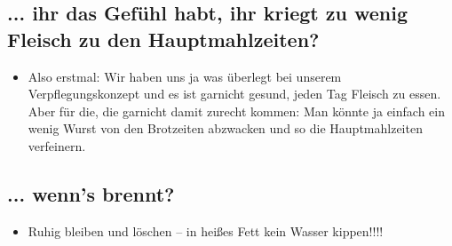 \subsection*{... ihr das Gefühl habt, ihr kriegt zu wenig Fleisch zu den Hauptmahlzeiten?} %
\label{sub:_ihr_das_gefuhl_habt_ihr_kriegt_zu_wenig_fleisch_zu_den_hauptmahlzeiten}
\begin{itemize}
    \item Also erstmal: Wir haben uns ja was überlegt bei unserem Verpflegungskonzept und es ist garnicht gesund, jeden Tag Fleisch zu essen. Aber für die, die garnicht damit zurecht kommen: Man könnte ja einfach ein wenig Wurst von den Brotzeiten abzwacken und so die Hauptmahlzeiten verfeinern.
\end{itemize}

\subsection*{... wenn's brennt?} %
\label{sub:_wenn_s_brennt}
\begin{itemize}
    \item Ruhig bleiben und löschen – in heißes Fett kein Wasser kippen!!!!
\end{itemize}
